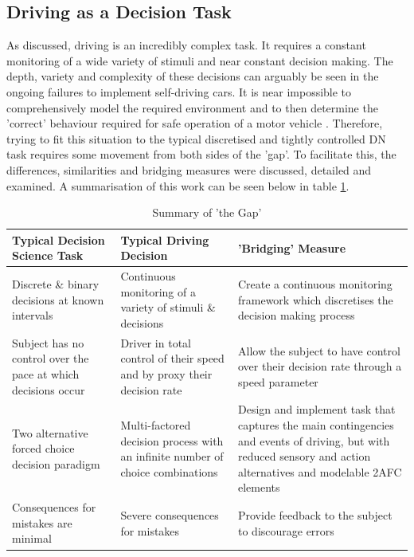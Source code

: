 \subsection{Driving as a Decision Task}
As discussed, driving is an incredibly complex task. It requires a constant monitoring of a wide variety of stimuli and near constant decision making. The depth, variety and complexity of these decisions can arguably be seen in the ongoing failures to implement self-driving cars. It is near impossible to comprehensively model the required environment and to then determine the 'correct' behaviour required for safe operation of a motor vehicle \citep{wolmarDriverlessCarsRoad2020}. Therefore, trying to fit this situation to the typical discretised and tightly controlled DN task requires some movement from both sides of the 'gap'. To facilitate this, the differences, similarities and bridging measures were discussed, detailed and examined. A summarisation of this work can be seen below in table \ref{tab:gap}.

\begin{table}[H]
    \begin{center}
        \caption{Summary of 'the Gap'}
        \label{tab:gap}
        \resizebox{\textwidth}{!} {
        \begin{tabular}{p{}|p{}|p{}}
        \hline
        Typical Decision Science Task & Typical Driving Decision & 'Bridging' Measure \\ \hline
        Discrete \& binary decisions at known intervals & Continuous monitoring of a variety of stimuli \& decisions & Create a continuous monitoring framework which discretises the decision making process \\ \hline
        Subject has no control over the pace at which decisions occur   & Driver in total control of their speed and by proxy their decision rate  & Allow the subject to have control over their decision rate through a speed parameter \\\hline
        Two alternative forced choice decision paradigm  & Multi-factored decision process with an infinite number of choice combinations  & Design and implement task that captures the main contingencies and events of driving, but with reduced sensory and action alternatives and modelable 2AFC elements\\\hline
        Consequences for mistakes are minimal & Severe consequences for mistakes  & Provide feedback to the subject to discourage errors\\ \hline
        \end{tabular}}
    \end{center}
\end{table}

